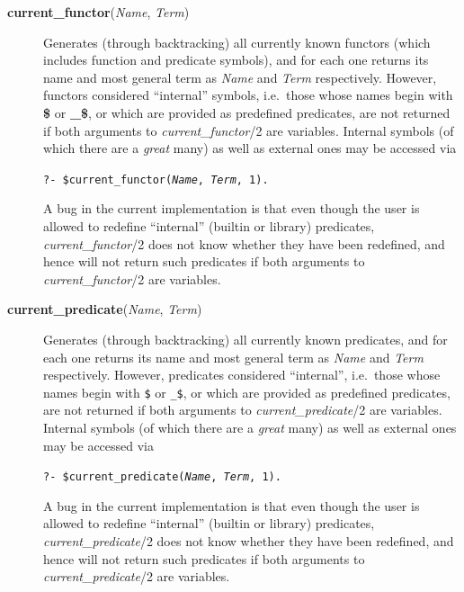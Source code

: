 \begin{description}
\item[{\bf current\_functor}({\em Name}, {\em Term})]
    Generates (through backtracking) all currently known functors (which
    includes function and predicate symbols), and for each one returns its name
    and most general term as {\em Name} and {\em Term} respectively.
    However, functors considered ``internal'' symbols, i.e.\ those whose names
    begin with {\bf \$} or {\bf \_\$}, or which are provided as predefined
    predicates, are not returned if both arguments to {\em current\_functor}/2
    are variables.
    Internal symbols (of which there are a {\em great} many)
    as well as external ones may be accessed via
    \begin{center}
    {\tt ?- \$current\_functor({\em Name}, {\em Term}, 1).}
    \end{center}
    A bug in the current implementation is that even though the user is allowed
    to redefine ``internal'' (builtin or library) predicates,
    {\em current\_functor}/2 does not know whether they have been redefined,
    and hence will not return such predicates if both arguments to
    {\em current\_functor}/2 are variables.

\item[{\bf current\_predicate}({\em Name}, {\em Term})]
    Generates (through backtracking) all currently known predicates, and for
    each one returns its name and most general term as {\em Name} and {\em Term}
    respectively.
    However, predicates considered ``internal'',
    i.e.\ those whose names begin with {\tt \$} or {\tt \_\$},
    or which are provided as predefined predicates,
    are not returned if both arguments to {\em current\_predicate}/2
    are variables.
    Internal symbols (of which there are a {\em great} many)
    as well as external ones may be accessed via
    \begin{center}
    {\tt ?- \$current\_predicate({\em Name}, {\em Term}, 1).}
    \end{center}
    A bug in the current implementation is that even though the user is allowed
    to redefine ``internal'' (builtin or library) predicates,
    {\em current\_predicate}/2 does not know whether they have been redefined,
    and hence will not return such predicates if both arguments to
    {\em current\_predicate}/2 are variables.


\end{description}
